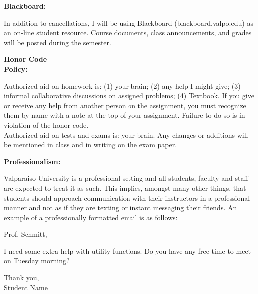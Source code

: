 \documentclass{article}
\theoremstyle{plain}
\theoremstyle{definition}
\theoremstyle{remark}
\begin{document}
\vskip0.1in \noindent
\begin{minipage}[t]{1.3in}
	\textbf{Blackboard:}
\end{minipage}
\begin{minipage}[t]{5.2in}
	In addition to cancellations, I will be using
Blackboard (blackboard.valpo.edu) as an on-line student resource.
Course documents, class announcements, and grades will be posted 
 during the semester.
\end{minipage}

\vskip0.1in \noindent
\begin{minipage}[t]{1.3in}
\textbf{Honor Code} \\ \textbf{Policy:} 
\end{minipage}
\begin{minipage}[t]{5.2in}
	Authorized aid on homework is: (1) your brain; (2) any help I might give; (3) informal collaborative discussions on assigned problems; (4) Textbook.  If you give or receive any help from another person on the assignment, you must recognize them by name with a note at the top of your assignment.  Failure to do so is in violation of the honor code.\\		
\vskip0.025in	
Authorized aid on tests and exams is:  your brain.  Any changes or additions will be mentioned in class and in writing on the exam paper.
\end{minipage}

\vskip0.1in \noindent
\begin{minipage}[t]{1.3in}
\textbf{Professionalism:} 
\end{minipage}
\begin{minipage}[t]{5.2in}
Valparaiso University is a professional setting and all students, faculty and staff are expected to treat it as such.  This implies, amongst many other things, that students should approach communication with their instructors in a professional manner and not as if they are texting or instant messaging their friends.  An example of a professionally formatted email is as follows:\\

\vspace{.01in}

Prof. Schmitt,\\

\vspace{.01in}

I need some extra help with utility functions.  Do you have any free time to meet on Tuesday morning?\\

\vspace{.005in}

Thank you,\\
Student Name
\end{minipage}
\end{document}
